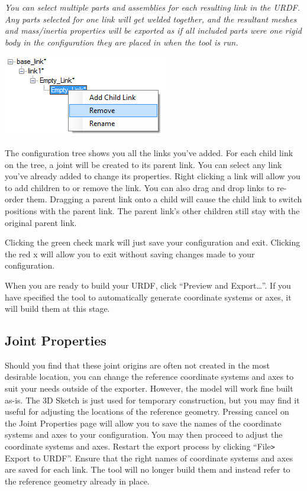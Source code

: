 \emph{You can select multiple parts and assemblies for each resulting link in the URDF.  Any parts selected for one link will get welded together, and the resultant meshes and mass/inertia properties will be exported as if all included parts were one rigid body in the configuration they are placed in when the tool is run.}

\includegraphics{images/ExportConfigTree}

The configuration tree shows you all the links you've added. For each child link on the tree, a joint will be created to its parent link. You can select any link you've already added to change its properties. Right clicking a link will allow you to add children to or remove the link. You can also drag and drop links to re-order them. Dragging a parent link onto a child will cause the child link to switch positions with the parent link. The parent link's other children still stay with the original parent link. 

Clicking the green check mark will just save your configuration and exit. Clicking the red x will allow you to exit without saving changes made to your configuration. 

When you are ready to build your URDF, click ``Preview and Export\ldots''. If you have specified the tool to automatically generate coordinate systems or axes, it will build them at this stage. 

\subsection{Joint Properties}
\indent Should you find that these joint origins are often not created in the most desirable location, you can change the reference coordinate systems and axes to suit your needs outside of the exporter. However, the model will work fine built as-is. The 3D Sketch is just used for temporary construction, but you may find it useful for adjusting the locations of the reference geometry. Pressing cancel on the Joint Properties page will allow you to save the names of the coordinate systems and axes to your configuration. You may then proceed to adjust the coordinate systems and axes. Restart the export process by clicking ``File\verb|>| Export to URDF''. Ensure that the right names of coordinate systems and axes are saved for each link. The tool will no longer build them and instead refer to the reference geometry already in place. 

